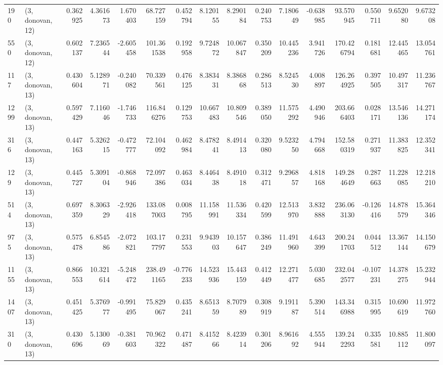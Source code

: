 \begin{tabular}{llrrrrrrrrrrrrrr}
190  &  (3, donovan, 12) &   0.362925 &   4.361673 &   1.670403 &     68.727159 &    0.452794 &    8.120155 &    8.290184 &  0.240753 &   7.180649 &  -0.638985 &    93.570945 &   0.550711 &   9.652080 &   9.673208 \\
550  &  (3, donovan, 12) &   0.602137 &   7.236544 &  -2.605458 &    101.361538 &    0.192958 &    9.724872 &   10.067847 &  0.350209 &  10.445236 &   3.941726 &   170.426794 &   0.181681 &  12.445465 &  13.054761 \\
117  &  (3, donovan, 13) &   0.430604 &   5.128971 &  -0.240082 &     70.339561 &    0.476125 &    8.383431 &    8.386868 &  0.286513 &   8.524530 &   4.008897 &   126.264925 &   0.397505 &  10.497317 &  11.236767 \\
1299 &  (3, donovan, 13) &   0.597429 &   7.116046 &  -1.746733 &    116.846276 &    0.129753 &   10.667483 &   10.809546 &  0.389050 &  11.575292 &   4.490946 &   203.666403 &   0.028171 &  13.546136 &  14.271174 \\
316  &  (3, donovan, 13) &   0.447163 &   5.326215 &  -0.472777 &     72.104092 &    0.462984 &    8.478241 &    8.491413 &  0.320080 &   9.523250 &   4.794668 &   152.580319 &   0.271937 &  11.383825 &  12.352341 \\
129  &  (3, donovan, 13) &   0.445727 &   5.309104 &  -0.868946 &     72.097386 &    0.463034 &    8.446438 &    8.491018 &  0.312471 &   9.296857 &   4.818168 &   149.284649 &   0.287663 &  11.228085 &  12.218210 \\
514  &  (3, donovan, 13) &   0.697359 &   8.306329 &  -2.926418 &    133.087003 &    0.008795 &   11.158991 &   11.536334 &  0.420599 &  12.513970 &   3.832888 &   236.063130 &  -0.126416 &  14.878579 &  15.364346 \\
975  &  (3, donovan, 13) &   0.575478 &   6.854586 &  -2.072821 &    103.177797 &    0.231553 &    9.943903 &   10.157647 &  0.386249 &  11.491960 &   4.643399 &   200.241703 &   0.044512 &  13.367144 &  14.150679 \\
1155 &  (3, donovan, 13) &   0.866553 &  10.321614 &  -5.248472 &    238.491165 &   -0.776233 &   14.523936 &   15.443159 &  0.412449 &  12.271477 &   5.030685 &   232.042577 &  -0.107231 &  14.378275 &  15.232944 \\
1407 &  (3, donovan, 13) &   0.451425 &   5.376977 &  -0.991495 &     75.829067 &    0.435241 &    8.651359 &    8.707989 &  0.308919 &   9.191187 &   5.390514 &   143.346988 &   0.315995 &  10.690619 &  11.972760 \\
310  &  (3, donovan, 13) &   0.430696 &   5.130069 &  -0.381603 &     70.962322 &    0.471487 &    8.415266 &    8.423914 &  0.301206 &   8.961692 &   4.555944 &   139.242293 &   0.335581 &  10.885112 &  11.800097 \\

\end{tabular}
